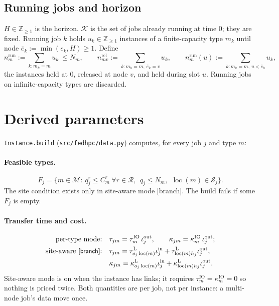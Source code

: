 \documentclass[11pt,a4paper]{article}
\theoremstyle{definition}
\theoremstyle{remark}
\newcommand{\M}{\mathcal{M}}
\newcommand{\K}{\mathcal{K}}
\newcommand{\Sites}{\mathcal{S}}
\newcommand{\Res}{\mathcal{R}}
\newcommand{\Z}{\mathbb{Z}}
\newcommand{\code}[1]{\texttt{#1}}
\newcommand{\loc}{\operatorname{loc}}
\newcommand{\nrun}{n^{\mathrm{run}}}
\newcommand{\nrel}{n^{\mathrm{rel}}}
\newcommand{\pin}{\mathrm{in}}
\newcommand{\pout}{\mathrm{out}}
\newcommand{\status}[1]{\textsf{\small[#1]}}
\begin{document}
\subsection{Running jobs and horizon}
$H\in\Z_{\ge1}$ is the horizon. $\K$ is the set of jobs already running at time
$0$; they are fixed. Running job $k$ holds $u_k\in\Z_{\ge1}$ instances of a
finite-capacity type $m_k$ until node $\bar e_k:=\min(e_k,H)\ge1$. Define
\[
\nrun_m:=\sum_{k:m_k=m}u_k\ \le N_m,\qquad
\nrel_{mv}:=\sum_{k:m_k=m,\ \bar e_k=v}u_k,\qquad
\nrun_m(u):=\sum_{k:m_k=m,\ u<\bar e_k}u_k,
\]
the instances held at $0$, released at node $v$, and held during slot $u$.
Running jobs on infinite-capacity types are discarded.

\section{Derived parameters}\label{sec:derived}

\code{Instance.build} (\code{src/fedhpc/data.py}) computes, for every job $j$
and type $m$:

\paragraph{Feasible types.}
\begin{equation}\label{eq:F}
F_j=\bigl\{m\in\M:\ q^r_j\le C^r_m\ \forall r\in\Res,\ \ q_j\le N_m,\ \
\loc(m)\in\Sites_j\bigr\}.
\end{equation}
The site condition exists only in site-aware mode \status{branch}. The build
fails if some $F_j$ is empty.

\paragraph{Transfer time and cost.}
\begin{align}
\text{per-type mode:}\quad&
\tau_{jm}=\tau^{\mathrm{IO}}_m\,\iota^\pout_j,\qquad
\kappa_{jm}=\kappa^{\mathrm{IO}}_m\,\iota^\pout_j;\label{eq:io-type}\\
\text{site-aware \status{branch}:}\quad&
\tau_{jm}=\tau^{\mathrm L}_{o_j\loc(m)}\iota^\pin_j+\tau^{\mathrm L}_{\loc(m)h_j}\iota^\pout_j,\notag\\
&\kappa_{jm}=\kappa^{\mathrm L}_{o_j\loc(m)}\iota^\pin_j+\kappa^{\mathrm L}_{\loc(m)h_j}\iota^\pout_j.\label{eq:io-geo}
\end{align}
Site-aware mode is on when the instance has links; it requires
$\tau^{\mathrm{IO}}_m=\kappa^{\mathrm{IO}}_m=0$ so nothing is priced twice. Both
quantities are per job, not per instance: a multi-node job's data move once.
\end{document}
